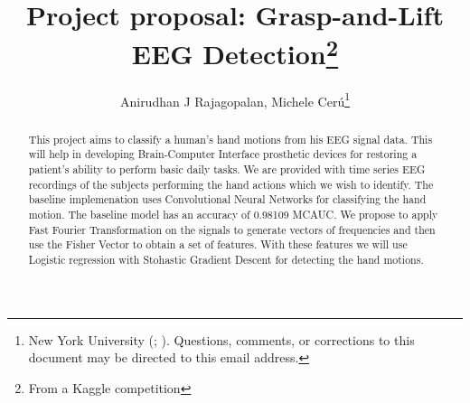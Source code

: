 \documentclass[]{article}
\title{Project proposal: Grasp-and-Lift EEG Detection\thanks{From a Kaggle competition}}
\author{Anirudhan J Rajagopalan, Michele Cer\'u\thanks{New York University (\email{ajr619@nyu.edu}; \email{mc3784@nyu.edu}). Questions, comments, or corrections
to this document may be directed to this email address.}}
\begin{document}
\maketitle
\newcommand{\slugmaster}{%
\slugger{siads}{xxxx}{xx}{x}{x---x}}%

\begin{abstract}
  This project aims to classify a human's hand motions from his EEG signal data.  This will help in developing Brain-Computer Interface prosthetic devices for restoring a patient's ability to perform basic daily tasks.
  We are provided with time series EEG recordings of the subjects performing the hand actions which we wish to identify.
  The baseline implemenation uses Convolutional Neural Networks for classifying the hand motion.  The baseline model has an accuracy of 0.98109 MCAUC\@.  
  We propose to apply Fast Fourier Transformation on the signals to generate vectors of frequencies and then use the Fisher Vector\cite{fisher} to obtain a set of features. 
  With these features we will use Logistic regression with Stohastic Gradient Descent for detecting the hand motions.
\end{abstract}

\pagestyle{myheadings}
\thispagestyle{plain}
\end{document}
